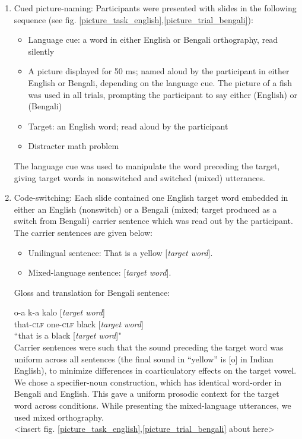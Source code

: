 \documentclass[12 pt]{article}
\newcommand{\nt}[1]{\textipa{[#1]}} %
\begin{document}
\begin{enumerate}[]
	\item Cued picture-naming: Participants were presented with slides in the following sequence (see fig. \ref{picture_task_english},\ref{picture_trial_bengali}):
	\begin{itemize}
		\item Language cue: a word in either English or Bengali orthography, read silently
		\item A picture displayed for 50 ms; named aloud by the participant in either English or Bengali, depending on the language cue. The picture of a fish was used in all trials, prompting the participant to say either \nt{fIS} (English) or \nt{ma: \textteshlig \super{h}} (Bengali)
		\item Target: an English word; read aloud by the participant
		\item Distracter math problem
	\end{itemize}
	The language cue was used to manipulate the word preceding the target, giving target words in nonswitched and switched (mixed) utterances. 
	
	\item Code-switching: Each slide contained one English target word embedded in either an English (nonswitch) or a Bengali (mixed; target produced as a switch from Bengali) carrier sentence which was read out by the participant. The carrier sentences are given below:
	\begin{itemize}
		\item Unilingual sentence: That is a yellow [\textit{target word}].
		\item Mixed-language sentence:  [\textit{target word}]. 
	\end{itemize}
	
Gloss and translation for Bengali sentence:

o-a \qquad \textipa{\ae}k-a \quad kalo [\textit{target word}]\\
that-\textsc{clf}  one-\textsc{clf}  black [\textit{target word}]\\
``that is a black [\textit{target word}]"\\
	
Carrier sentences were such that the sound preceding the target word was uniform across all sentences (the final sound in ``yellow'' is [o] in Indian English), to minimize differences in coarticulatory effects on the target vowel. We chose a specifier-noun construction, which has identical word-order in Bengali and English. This gave a uniform prosodic context for the target word across conditions. While presenting the mixed-language utterances, we used mixed orthography. \\

<insert fig. \ref{picture_task_english},\ref{picture_trial_bengali} about here>
	
\end{enumerate}
\end{document}
